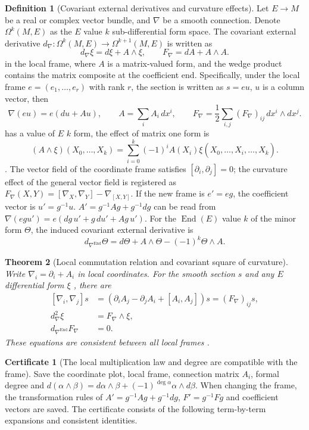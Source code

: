 \documentclass[12pt,a4paper,openany,notitlepage]{report}
\theoremstyle{plain}
\newtheorem{theorem}{Theorem}[chapter]
\theoremstyle{definition}
\newtheorem{definition}[theorem]{Definition}
\newtheorem*{certificate}{Certificate}
\theoremstyle{remark}
\begin{document}
\begin{CJK*}
\begin{definition}
[Covariant external derivatives and curvature effects]\label{hgov:geo:def:exterior}
Let $E\to M$ be a real or complex vector bundle, and $\nabla$ be a smooth connection. Denote $\Omega^k(M,E)$ as the $E$ value $k$ sub-differential form space. The covariant external derivative $d_\nabla:\Omega^k(M,E)\to\Omega^{k+1}(M,E)$ is written as \[
d_\nabla\xi=d\xi+A\wedge\xi,
\qquad F_\nabla=dA+A\wedge A.
\] in the local frame, where $A$ is a matrix-valued form, and the wedge product contains the matrix composite at the coefficient end. Specifically, under the local frame $e=(e_1,\ldots,e_r)$ with rank $r$, the section is written as $s=e u$, $u$ is a column vector, then \[
\nabla(eu)=e(du+Au),\qquad
A=\sum_iA_i\,dx^i,
\qquad
F_\nabla=\frac12\sum_{i,j}(F_\nabla)_{ij}\,dx^i\wedge dx^j.
\] has a value of $E$ $k$ form, the effect of matrix one form is \[
(A\wedge\xi)(X_0,\ldots,X_k)
=\sum_{i=0}^k(-1)^iA(X_i)
\xi(X_0,\ldots,\widehat X_i,\ldots,X_k).
\]. The vector field of the coordinate frame satisfies $[\partial_i,\partial_j]=0$; the curvature effect of the general vector field is registered as $F_\nabla(X,Y)=[\nabla_X,\nabla_Y]-\nabla_{[X,Y]}$. If the new frame is $e'=e g$, the coefficient vector is $u'=g^{-1}u$. $A'=g^{-1}Ag+g^{-1}dg$ can be read from $\nabla(e g u')=e(dg\,u'+g\,du'+Ag\,u')$. For the $\operatorname{End}(E)$ value $k$ of the minor form $\Theta$, the induced covariant external derivative is \[
d_{\nabla^{\operatorname{End}}}\Theta
=d\Theta+A\wedge\Theta-(-1)^k\Theta\wedge A.
\]\end{definition}


\begin{theorem}
[Local commutation relation and covariant square of curvature]\label{hgov:geo:thm:curvature}
Write $\nabla_i=\partial_i+A_i$ in local coordinates. For the smooth section $s$ and any $E$ differential form $\xi$ , there are \begin{align}
\label{hgov:geo:eq:commutator}
[\nabla_i,\nabla_j]s
&=(\partial_iA_j-\partial_jA_i+[A_i,A_j])s
=(F_\nabla)_{ij}s,\\
\label{hgov:geo:eq:covariant-square}
d_\nabla^2\xi&=F_\nabla\wedge\xi,\\
\label{hgov:geo:eq:bianchi}
d_{\nabla^{\operatorname{End}}}F_\nabla&=0.
\end{align} These equations are consistent between all local frames \cite{ExtKobayashiNomizu,ExtBottTu} .\end{theorem}


\begin{certificate}
[The local multiplication law and degree are compatible with the frame]Save the coordinate plot, local frame, connection matrix $A_i$, formal degree and $d(\alpha\wedge\beta)=d\alpha\wedge\beta+(-1)^{\deg\alpha}\alpha\wedge d\beta$. When changing the frame, the transformation rules of $A'=g^{-1}Ag+g^{-1}dg$, $F'=g^{-1}Fg$ and coefficient vectors are saved. The certificate consists of the following term-by-term expansions and consistent identities.\end{certificate}



\end{CJK*}
\end{document}
